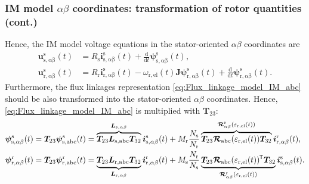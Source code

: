 \begin{frame}
	\frametitle{IM model $\alpha\beta$ coordinates: transformation of rotor quantities (cont.)}
    Hence, the IM model voltage equations in the stator-oriented $\alpha\beta$ coordinates are
    \begin{equation}
        \begin{split}
        \bm{u}^\mathrm{s}_\mathrm{s,\alpha\beta}(t) &= R_\mathrm{s} \bm{i}^\mathrm{s}_\mathrm{s,\alpha\beta}(t)+ \frac{\mathrm{d}}{\mathrm{d}t}\bm{\psi}^\mathrm{s}_\mathrm{s,\alpha\beta}(t),\\
        \bm{u}^\mathrm{s}_\mathrm{r,\alpha\beta}(t) &= R_\mathrm{r} \bm{i}^\mathrm{s}_\mathrm{r,\alpha\beta}(t)-\omega_\mathrm{r,el}(t)\bm{J}\bm{\psi}^\mathrm{s}_\mathrm{r,\alpha\beta}(t) +\frac{\mathrm{d}}{\mathrm{d}t}\bm{\psi}^\mathrm{s}_\mathrm{r,\alpha\beta}(t).
    \end{split}
    \label{eq:IM_model_alpha_beta_voltage_equations_stator_oriented}
\end{equation} 
Furthermore, the flux linkages representation \eqref{eq:Flux_linkage_model_IM_abc} should be also transformed into the stator-oriented $\alpha\beta$ coordinates. Hence, \eqref{eq:Flux_linkage_model_IM_abc} is multiplied with $\bm{T}_{23}$:
\begin{equation}
    \begin{split}
        \bm{\psi}^\mathrm{s}_\mathrm{s,\alpha\beta}(t) & = \bm{T}_{23} \bm{\psi}^\mathrm{s}_\mathrm{s,abc}(t) = \overbrace{\bm{T}_{23} \bm{L}_{\mathrm{s,abc}}\bm{T}_{32}}^{\bm{L}_{\mathrm{s},\alpha\beta}} \bm{i}^\mathrm{s}_{\mathrm{s},\alpha\beta}(t) +  M_{\mathrm{r}}\frac{N_\mathrm{s}}{N_\mathrm{r}} \overbrace{\bm{T}_{23}\bm{\mathcal{R}}_\mathrm{abc}(\varepsilon_\mathrm{r,el}(t))\bm{T}_{32}}^{\bm{\mathcal{R}}^\mathrm{s}_{\alpha\beta}(\varepsilon_\mathrm{r,el}(t))}\bm{i}^\mathrm{r}_{\mathrm{r},\alpha\beta}(t),\\
        \bm{\psi}^\mathrm{r}_\mathrm{r,\alpha\beta}(t) & = \bm{T}_{23} \bm{\psi}^\mathrm{r}_\mathrm{r,abc}(t) = \underbrace{\bm{T}_{23} \bm{L}_{\mathrm{r,abc}}\bm{T}_{32}}_{\bm{L}_{\mathrm{r},\alpha\beta}} \bm{i}^\mathrm{r}_{\mathrm{r},\alpha\beta}(t) +  M_{\mathrm{s}}\frac{N_\mathrm{r}}{N_\mathrm{s}} \underbrace{\bm{T}_{23}\bm{\mathcal{R}}_\mathrm{abc}(\varepsilon_\mathrm{r,el}(t))^{\mkern-1.5mu\mathsf{T}}\bm{T}_{32}}_{\bm{\mathcal{R}}^\mathrm{r}_{\alpha\beta}(\varepsilon_\mathrm{r,el}(t))}\bm{i}^\mathrm{s}_{\mathrm{s},\alpha\beta}(t).
    \end{split}
    \label{eq:IM_model_alpha_beta_flux_linkage_equations}
\end{equation}
\end{frame}

